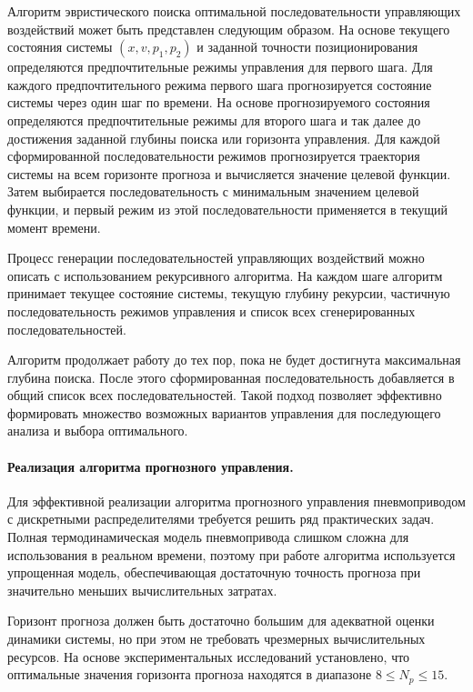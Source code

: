 Алгоритм эвристического поиска оптимальной последовательности управляющих воздействий
может быть представлен следующим образом. На основе текущего состояния
системы $(x, v, p_1, p_2)$ и заданной точности позиционирования определяются
предпочтительные режимы управления для первого шага. Для каждого предпочтительного
режима первого шага прогнозируется состояние системы через один шаг по времени. На основе
прогнозируемого состояния определяются предпочтительные режимы для второго шага
и так далее до достижения заданной глубины поиска или горизонта управления.
Для каждой сформированной последовательности режимов прогнозируется траектория системы на
всем горизонте прогноза и вычисляется значение целевой функции. Затем выбирается
последовательность с минимальным значением целевой функции, и первый
режим из этой последовательности применяется в текущий момент времени.

Процесс генерации последовательностей управляющих воздействий можно описать
с использованием рекурсивного алгоритма. На каждом шаге алгоритм
принимает текущее состояние системы, текущую глубину рекурсии,
частичную последовательность режимов управления и список всех сгенерированных последовательностей.

Алгоритм продолжает работу до тех пор, пока не будет достигнута
максимальная глубина поиска. После этого сформированная последовательность
добавляется в общий список всех последовательностей. Такой подход позволяет
эффективно формировать множество возможных вариантов управления для
последующего анализа и выбора оптимального.

\paragraph*{Реализация алгоритма прогнозного управления.}

Для эффективной реализации алгоритма прогнозного управления пневмоприводом с дискретными
распределителями требуется
решить ряд практических задач. Полная термодинамическая модель пневмопривода слишком сложна
для использования в реальном времени, поэтому при работе алгоритма используется упрощенная модель,
обеспечивающая достаточную точность прогноза при значительно меньших вычислительных затратах.

Горизонт прогноза должен быть достаточно большим для адекватной оценки динамики системы,
но при этом не требовать чрезмерных вычислительных ресурсов. На основе экспериментальных исследований
установлено, что оптимальные значения горизонта прогноза находятся в диапазоне $8 \leq N_p \leq 15$.

